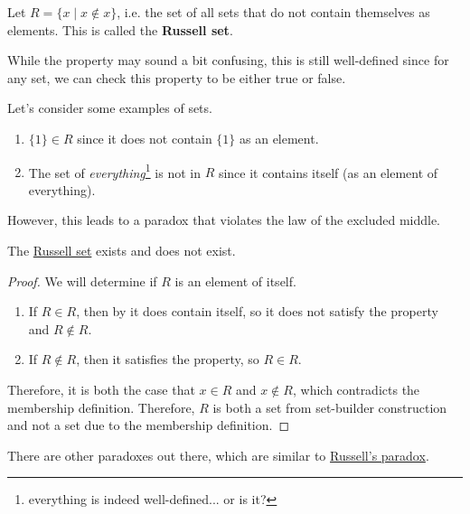 \begin{definition}
  \label{def:russell-set}
  Let $R = \{x \mid x \not\in x\}$, i.e. the set of all sets that do not contain themselves as elements. This is called the \textbf{Russell set}. 
\end{definition}

While the property may sound a bit confusing, this is still well-defined since for any set, we can check this property to be either true or false. 

\begin{example}
  \label{ex:russell-property-is-verifiable}
  Let's consider some examples of sets. 
  \begin{enumerate}
    \item $\{1\} \in R$ since it does not contain $\{1\}$ as an element. 
    \item The set of \textit{everything}\footnote{everything is indeed well-defined... or is it?} is not in $R$ since it contains itself (as an element of everything). 
  \end{enumerate}
\end{example}

However, this leads to a paradox that violates the law of the excluded middle. 

\begin{theorem}
  \label{thm:russells-paradox}
 
  The \hyperref[def:russell-set]{Russell set} exists and does not exist. 
\end{theorem}
\begin{proof}
  We will determine if $R$ is an element of itself. 
  \begin{enumerate}
    \item If $R \in R$, then by it does contain itself, so it does not satisfy the property and $R \not\in R$. 
    \item If $R \not\in R$, then it satisfies the property, so $R \in R$. 
  \end{enumerate}
  Therefore, it is both the case that $x \in R$ and $x \not\in R$, which contradicts the membership definition. Therefore, $R$ is both a set from set-builder construction and not a set due to the membership definition. 
\end{proof}

There are other paradoxes out there, which are similar to \hyperref[thm:russells-paradox]{Russell's paradox}. 


